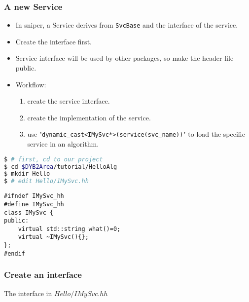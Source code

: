 
\begin{frame}
    \frametitle{A new Service}
    \begin{itemize}
        \item In sniper, a Service derives from {\tt SvcBase} and 
                the interface of the service.
        \item Create the interface first. 
        \item Service interface will be used by other packages, so make the 
                header file public.
        \item Workflow:
        \begin{enumerate}
            \item create the service interface.
            \item create the implementation of the service.
            \item use "{\tt dynamic\_cast<IMySvc*>(service(svc\_name))}"
                  to load the specific service in an algorithm.
        \end{enumerate}
    \end{itemize}
\end{frame}

\newsavebox{\createinterface}
\begin{lrbox}{\createinterface}
\begin{lstlisting}[language=bash]
$ # first, cd to our project
$ cd $DYB2Area/tutorial/HelloAlg
$ mkdir Hello 
$ # edit Hello/IMySvc.hh
\end{lstlisting}
\end{lrbox}

\newsavebox{\createinterfaceheader}
\begin{lrbox}{\createinterfaceheader}
\begin{lstlisting}
#ifndef IMySvc_hh
#define IMySvc_hh
class IMySvc {
public:
    virtual std::string what()=0;
    virtual ~IMySvc(){};
};
#endif
\end{lstlisting}
\end{lrbox}

\begin{frame}
    \frametitle{Create an interface}
    \par\usebox{\createinterface}
    \begin{block}{The interface in \(Hello/IMySvc.hh\)}
    \par\usebox{\createinterfaceheader}
    \end{block}
\end{frame}

